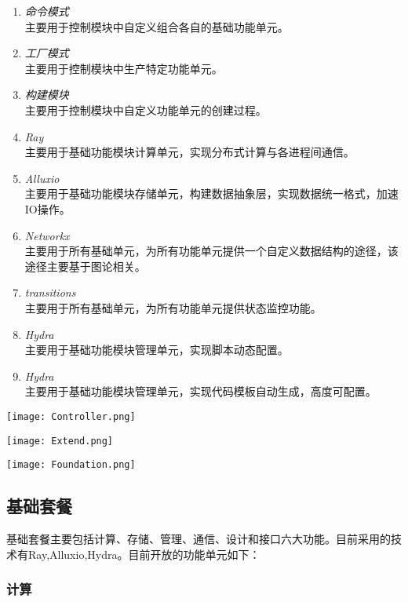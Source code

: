\documentclass[cn,hazy,blue,14pt,screen]{elegantnote}
\begin{document}
\begin{enumerate}[label=\arabic*).]
	\item \textit{命令模式}\\
	主要用于控制模块中自定义组合各自的基础功能单元。
	\item \textit{工厂模式}\\
	主要用于控制模块中生产特定功能单元。
	\item \textit{构建模块}\\
	主要用于控制模块中自定义功能单元的创建过程。
	\item \textit{Ray}\\
	主要用于基础功能模块计算单元，实现分布式计算与各进程间通信。
	\item \textit{Alluxio}\\
	主要用于基础功能模块存储单元，构建数据抽象层，实现数据统一格式，加速IO操作。
	\item \textit{Networkx}\\
	主要用于所有基础单元，为所有功能单元提供一个自定义数据结构的途径，该途径主要基于图论相关。
	\item \textit{transitions}\\
	主要用于所有基础单元，为所有功能单元提供状态监控功能。
	\item \textit{Hydra}\\
	主要用于基础功能模块管理单元，实现脚本动态配置。
	\item \textit{Hydra}\\
	主要用于基础功能模块管理单元，实现代码模板自动生成，高度可配置。	
\end{enumerate}

\centerline{
	\texttt{[image: Controller.png]}
}

\centerline{
	\texttt{[image: Extend.png]}
}

\centerline{
	\texttt{[image: Foundation.png]}
}




\subsection{基础套餐}

基础套餐主要包括计算、存储、管理、通信、设计和接口六大功能。目前采用的技术有Ray,Alluxio,Hydra。目前开放的功能单元如下：



\subsubsection{计算}
\end{document}
